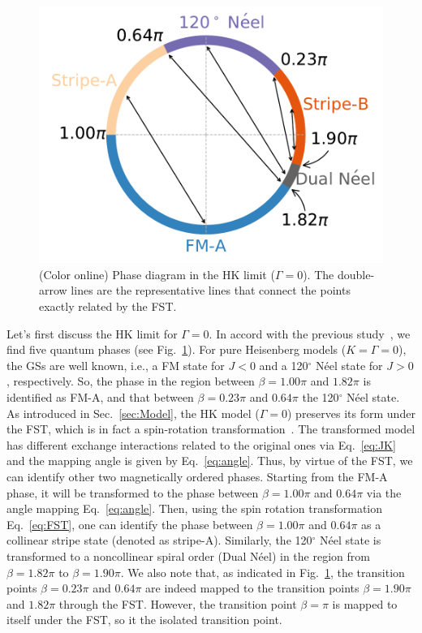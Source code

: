 \documentclass[aps,prb,reprint,amsfonts,amsmath,amssymb,showpacs,groupedaddress,superscriptaddress]{revtex4-1}
\begin{document}
\begin{figure}
    \centering
    \includegraphics[width=\columnwidth]{HKModel.pdf}
    \caption{\label{fig:HKModel}(Color online) Phase diagram in the HK limit ($\Gamma=0$). The double-arrow lines are the representative lines that connect the points exactly related by the FST.}
\end{figure}
Let's first discuss the HK limit for $\Gamma=0$. In accord with the previous study~\cite{KaiLi2015}, we find five quantum phases (see Fig.~\ref{fig:HKModel}). For pure Heisenberg models ($K=\Gamma=0$), the GSs are well known, i.e., a FM state for $J<0$ and a 120$^\circ$ N\'{e}el state for $J>0$, respectively. So, the phase in the region between $\beta=1.00\pi$ and $1.82\pi$ is identified as FM-A, and that between $\beta=0.23\pi$ and $0.64\pi$ the 120$^\circ$ N\'{e}el state. As introduced in Sec.~\ref{sec:Model}, the HK model ($\Gamma=0$) preserves its form under the FST, which is in fact a spin-rotation transformation~\cite{PhysRevB.89.014414}. The transformed model has different exchange interactions related to the original ones via Eq.~\eqref{eq:JK} and the mapping angle is given by Eq.~\eqref{eq:angle}. Thus, by virtue of the FST, we can identify other two magnetically ordered phases. Starting from the FM-A phase, it will be transformed to the phase between $\beta=1.00\pi$ and $0.64\pi$ via the angle mapping Eq.~\eqref{eq:angle}. Then, using the spin rotation transformation Eq.~\eqref{eq:FST}, one can identify the phase between $\beta=1.00\pi$ and $0.64\pi$ as a collinear stripe state (denoted as stripe-A). Similarly, the 120$^\circ$ N\'{e}el state is transformed to a noncollinear spiral order (Dual N\'{e}el) in the region from $\beta=1.82\pi$ to $\beta=1.90\pi$. We also note that, as indicated in Fig.~\ref{fig:HKModel}, the transition points $\beta=0.23\pi$ and $0.64\pi$ are indeed mapped to the transition points $\beta=1.90\pi$ and $1.82\pi$ through the FST. However, the transition point $\beta=\pi$ is mapped to itself under the FST, so it the isolated transition point.
\end{document}
